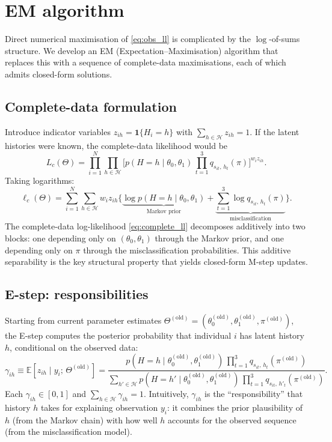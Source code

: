 \documentclass[12pt]{article}
\begin{document}
\section{EM algorithm}
\label{sec:em}

Direct numerical maximisation of \eqref{eq:obs_ll} is complicated by the
\(\log\)-of-sums structure. We develop an EM (Expectation--Maximisation)
algorithm that replaces this with a sequence of complete-data
maximisations, each of which admits closed-form solutions.

\subsection{Complete-data formulation}

Introduce indicator variables \(z_{ih} = \mathbf{1}\{H_i = h\}\) with
\(\sum_{h \in \mathcal{H}} z_{ih} = 1\). If the latent histories were
known, the complete-data likelihood would be
\[
L_c(\Theta) = \prod_{i=1}^{N} \prod_{h \in \mathcal{H}}
\Big[
  p(H = h \mid \theta_0, \theta_1)\,
  \prod_{t=1}^{3} q_{s_{it},\, h_t}(\pi)
\Big]^{w_i z_{ih}}.
\]
Taking logarithms:
\begin{equation}
\ell_c(\Theta) = \sum_{i=1}^{N} \sum_{h \in \mathcal{H}} w_i z_{ih}
\bigg\{
  \underbrace{\log p(H = h \mid \theta_0, \theta_1)}_{\text{Markov prior}}
  + \underbrace{\sum_{t=1}^{3} \log q_{s_{it},\, h_t}(\pi)}_{\text{misclassification}}
\bigg\}.
\label{eq:complete_ll}
\end{equation}
The complete-data log-likelihood \eqref{eq:complete_ll} decomposes
additively into two blocks: one depending only on
\((\theta_0, \theta_1)\) through the Markov prior, and one depending
only on \(\pi\) through the misclassification probabilities. This
additive separability is the key structural property that yields
closed-form M-step updates.

\subsection{E-step: responsibilities}
\label{sec:estep}

Starting from current parameter estimates
\(\Theta^{(\text{old})} = (\theta_0^{(\text{old})}, \theta_1^{(\text{old})}, \pi^{(\text{old})})\),
the E-step computes the posterior probability that individual \(i\) has
latent history \(h\), conditional on the observed data:
\begin{equation}
\gamma_{ih} \equiv \mathbb{E}[z_{ih} \mid y_i;\, \Theta^{(\text{old})}]
= \frac{
  p(H = h \mid \theta_0^{(\text{old})}, \theta_1^{(\text{old})})\,
  \prod_{t=1}^{3} q_{s_{it},\, h_t}(\pi^{(\text{old})})
}{
  \sum_{h' \in \mathcal{H}}
  p(H = h' \mid \theta_0^{(\text{old})}, \theta_1^{(\text{old})})\,
  \prod_{t=1}^{3} q_{s_{it},\, h'_t}(\pi^{(\text{old})})
}.
\label{eq:responsibility}
\end{equation}
Each \(\gamma_{ih} \in [0, 1]\) and
\(\sum_{h \in \mathcal{H}} \gamma_{ih} = 1\). Intuitively,
\(\gamma_{ih}\) is the ``responsibility'' that history \(h\) takes for
explaining observation \(y_i\): it combines the prior plausibility of
\(h\) (from the Markov chain) with how well \(h\) accounts for the
observed sequence (from the misclassification model).
\end{document}
